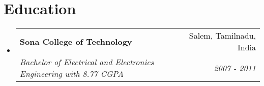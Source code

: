 \documentclass[letterpaper,11pt]{article}
\makeatletter
\newcommand{\resumeItem}[1]{
  \item\small{
    #1
  }
}
\newcommand{\resumeSubheading}[4]{
  \vspace{-1pt}\item
    \begin{tabular*}{0.97\textwidth}[t]{l@{\extracolsep{\fill}}r}
      \textbf{#1} & #2 \\
      \textit{\small#3} & \textit{\small #4} \\
    \end{tabular*}\vspace{-5pt}
}
\newcommand{\resumeSubItem}[2]{\resumeItem{#1}{#2}\vspace{-4pt}}
\newcommand{\resumeSubHeadingListStart}{\begin{itemize}[leftmargin=*]}
\newcommand{\resumeSubHeadingListEnd}{\end{itemize}}
\makeatother
\begin{document}


\section{Education}
  \resumeSubHeadingListStart
    \resumeSubheading
      {Sona College of Technology}{Salem, Tamilnadu, India}      
      {Bachelor of Electrical and Electronics Engineering with 8.77 CGPA}{2007 - 2011}
  \resumeSubHeadingListEnd

\end{document}
